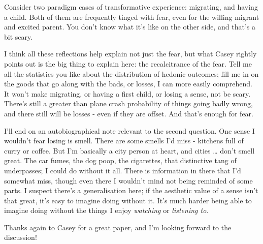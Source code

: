 \documentclass[
  11pt,
  letterpaper,
  DIV=11,
  numbers=noendperiod,
  oneside]{scrartcl}
\begin{document}
Consider two paradigm cases of transformative experience: migrating, and
having a child. Both of them are frequently tinged with fear, even for
the willing migrant and excited parent. You don't know what it's like on
the other side, and that's a bit scary.

I think all these reflections help explain not just the fear, but what
Casey rightly points out is the big thing to explain here: the
recalcitrance of the fear. Tell me all the statistics you like about the
distribution of hedonic outcomes; fill me in on the goods that go along
with the bads, or losses, I can more easily comprehend. It won't make
migrating, or having a first child, or losing a sense, not be scary.
There's still a greater than plane crash probability of things going
badly wrong, and there still will be losses - even if they are offset.
And that's enough for fear.

I'll end on an autobiographical note relevant to the second question.
One sense I wouldn't fear losing is smell. There are some smells I'd
miss - kitchens full of curry or coffee. But I'm basically a city person
at heart, and cities \ldots{} don't smell great. The car fumes, the dog
poop, the cigarettes, that distinctive tang of underpasses; I could do
without it all. There is information in there that I'd somewhat miss,
though even there I wouldn't mind not being reminded of some parts. I
suspect there's a generalisation here; if the aesthetic value of a sense
isn't that great, it's easy to imagine doing without it. It's much
harder being able to imagine doing without the things I enjoy
\emph{watching} or \emph{listening to}.

Thanks again to Casey for a great paper, and I'm looking forward to the
discussion!
\end{document}
